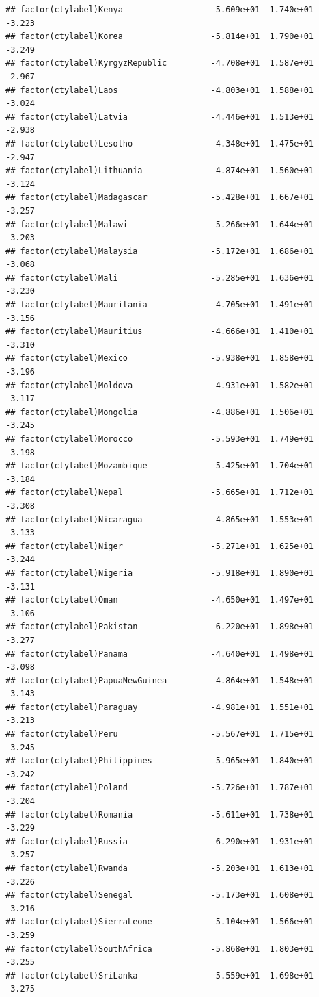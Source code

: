 \documentclass[12pt]{article}\usepackage[]{graphicx}\usepackage[]{color}
\makeatletter
\newenvironment{kframe}{%
 \def\at@end@of@kframe{}%
 \ifinner\ifhmode%
  \def\at@end@of@kframe{\end{minipage}}%
  \begin{minipage}{\columnwidth}%
 \fi\fi%
 \def\FrameCommand##1{\hskip\@totalleftmargin \hskip-\fboxsep
 \colorbox{shadecolor}{##1}\hskip-\fboxsep
     \hskip-\linewidth \hskip-\@totalleftmargin \hskip\columnwidth}%
 \MakeFramed {\advance\hsize-\width
   \@totalleftmargin\z@ \linewidth\hsize
   \@setminipage}}%
 {\par\unskip\endMakeFramed%
 \at@end@of@kframe}
\newenvironment{knitrout}{}{} %
\makeatother
\begin{document}
\begin{knitrout}
\begin{kframe}
\begin{verbatim}
## factor(ctylabel)Kenya                  -5.609e+01  1.740e+01  -3.223
## factor(ctylabel)Korea                  -5.814e+01  1.790e+01  -3.249
## factor(ctylabel)KyrgyzRepublic         -4.708e+01  1.587e+01  -2.967
## factor(ctylabel)Laos                   -4.803e+01  1.588e+01  -3.024
## factor(ctylabel)Latvia                 -4.446e+01  1.513e+01  -2.938
## factor(ctylabel)Lesotho                -4.348e+01  1.475e+01  -2.947
## factor(ctylabel)Lithuania              -4.874e+01  1.560e+01  -3.124
## factor(ctylabel)Madagascar             -5.428e+01  1.667e+01  -3.257
## factor(ctylabel)Malawi                 -5.266e+01  1.644e+01  -3.203
## factor(ctylabel)Malaysia               -5.172e+01  1.686e+01  -3.068
## factor(ctylabel)Mali                   -5.285e+01  1.636e+01  -3.230
## factor(ctylabel)Mauritania             -4.705e+01  1.491e+01  -3.156
## factor(ctylabel)Mauritius              -4.666e+01  1.410e+01  -3.310
## factor(ctylabel)Mexico                 -5.938e+01  1.858e+01  -3.196
## factor(ctylabel)Moldova                -4.931e+01  1.582e+01  -3.117
## factor(ctylabel)Mongolia               -4.886e+01  1.506e+01  -3.245
## factor(ctylabel)Morocco                -5.593e+01  1.749e+01  -3.198
## factor(ctylabel)Mozambique             -5.425e+01  1.704e+01  -3.184
## factor(ctylabel)Nepal                  -5.665e+01  1.712e+01  -3.308
## factor(ctylabel)Nicaragua              -4.865e+01  1.553e+01  -3.133
## factor(ctylabel)Niger                  -5.271e+01  1.625e+01  -3.244
## factor(ctylabel)Nigeria                -5.918e+01  1.890e+01  -3.131
## factor(ctylabel)Oman                   -4.650e+01  1.497e+01  -3.106
## factor(ctylabel)Pakistan               -6.220e+01  1.898e+01  -3.277
## factor(ctylabel)Panama                 -4.640e+01  1.498e+01  -3.098
## factor(ctylabel)PapuaNewGuinea         -4.864e+01  1.548e+01  -3.143
## factor(ctylabel)Paraguay               -4.981e+01  1.551e+01  -3.213
## factor(ctylabel)Peru                   -5.567e+01  1.715e+01  -3.245
## factor(ctylabel)Philippines            -5.965e+01  1.840e+01  -3.242
## factor(ctylabel)Poland                 -5.726e+01  1.787e+01  -3.204
## factor(ctylabel)Romania                -5.611e+01  1.738e+01  -3.229
## factor(ctylabel)Russia                 -6.290e+01  1.931e+01  -3.257
## factor(ctylabel)Rwanda                 -5.203e+01  1.613e+01  -3.226
## factor(ctylabel)Senegal                -5.173e+01  1.608e+01  -3.216
## factor(ctylabel)SierraLeone            -5.104e+01  1.566e+01  -3.259
## factor(ctylabel)SouthAfrica            -5.868e+01  1.803e+01  -3.255
## factor(ctylabel)SriLanka               -5.559e+01  1.698e+01  -3.275

\end{verbatim}
\end{kframe}
\end{knitrout}
\end{document}
